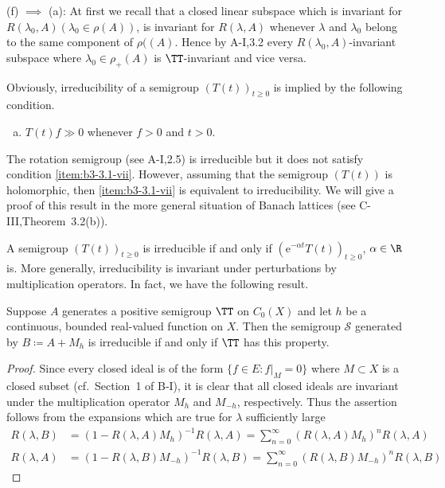 (f) $\implies$ (a): At first we recall that a closed linear subspace which is invariant for $R(\lambda_0,A)  (\lambda_0 \in \rho(A))$, is invariant for $R(\lambda ,A)$
whenever $\lambda$ and $\lambda_0$ belong to the same component of $\rho((A)$. 
Hence by A-I,3.2 every $R(\lambda_0,A)$-invariant subspace where $\lambda_0 \in \rho_{+}(A)$ is 
$\TT$-invariant and vice versa.
\begin{remark}\label{rem:b3-3.2}
	Obviously, irreducibility of a semigroup $(T(t))_{t\geq 0}$ is implied by the following condition.
\begin{enumerate}[(g)]	
\item\label{item:b3-3.1-vii}
$T(t)f \gg 0$ whenever $f > 0$ and $t > 0$.
\end{enumerate}
The rotation semigroup (see A-I,2.5) is irreducible but it does not satisfy condition \ref{item:b3-3.1-vii}.
	However, assuming that the semigroup $(T(t))$ is holomorphic, then \ref{item:b3-3.1-vii}
	is equivalent to irreducibility.
	We will give a proof of this result in the more general situation of Banach lattices (see C-III,Theorem~3.2(b)).
\end{remark}
A semigroup $(T(t))_{t \ge 0}$ is irreducible if and only if $(\mathrm{e}^{-\alpha t}T(t))_{t \ge 0}$, 
$\alpha \in \R$  is. More generally, irreducibility is invariant under pertur­bations by multiplication operators. In fact, we have the following result. 
\begin{proposition}\label{prop:b3-3.3}
	Suppose $A$ generates a positive semigroup $\TT$ on $C_{0}(X)$ and let $h$ be a continuous, bounded real-valued function on $X$.
	Then the semigroup $\mathcal{S}$ generated by $B \coloneqq A + M_{h}$ is irreducible if and only if\/ $\TT$ has this property.
\end{proposition}
%
%
\begin{proof}
	Since every closed ideal is of the form $\{f \in E : f|_{M} = 0\}$ where $M \subset X$ is a closed subset (cf.\ Section~1 of B-I), it is clear that all closed ideals are invariant under the multiplication operator $M_{h}$ and $M_{-h}$, respectively.
	Thus the assertion follows from the expansions which are true for $\lambda$ sufficiently large
\begin{align*}
R(\lambda,B) &= (1 - R(\lambda,A)M_{h})^{-1}R(\lambda,A) 
	= \sum_{n=0}^{\infty} (R(\lambda,A)M_{h})^{n}R(\lambda,A) \\
R(\lambda,A) &= (1 - R(\lambda,B)M_{-h})^{-1}R(\lambda,B) = \sum_{n=0}^{\infty} (R(\lambda,B)M_{-h})^{n}R(\lambda,B)
\end{align*} 
\end{proof}
